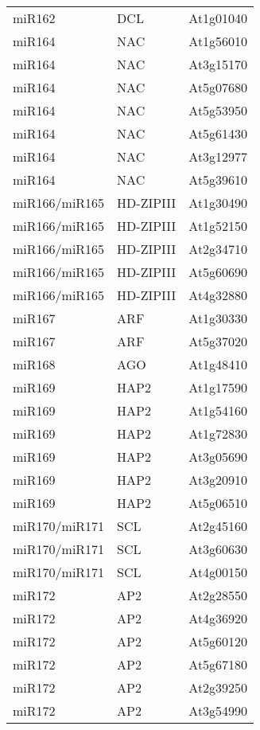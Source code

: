 \begin{table}
\begin{tabular}{lll}
miR162        & DCL          & At1g01040 \\
miR164        & NAC          & At1g56010 \\
miR164        & NAC          & At3g15170 \\
miR164        & NAC          & At5g07680 \\
miR164        & NAC          & At5g53950 \\
miR164        & NAC          & At5g61430 \\
miR164        & NAC          & At3g12977 \\
miR164        & NAC          & At5g39610 \\
miR166/miR165 & HD-ZIPIII    & At1g30490 \\
miR166/miR165 & HD-ZIPIII    & At1g52150 \\
miR166/miR165 & HD-ZIPIII    & At2g34710 \\
miR166/miR165 & HD-ZIPIII    & At5g60690 \\
miR166/miR165 & HD-ZIPIII    & At4g32880 \\
miR167        & ARF          & At1g30330 \\
miR167        & ARF          & At5g37020 \\
miR168        & AGO          & At1g48410 \\
miR169        & HAP2         & At1g17590 \\
miR169        & HAP2         & At1g54160 \\
miR169        & HAP2         & At1g72830 \\
miR169        & HAP2         & At3g05690 \\
miR169        & HAP2         & At3g20910 \\
miR169        & HAP2         & At5g06510 \\
miR170/miR171 & SCL          & At2g45160 \\
miR170/miR171 & SCL          & At3g60630 \\
miR170/miR171 & SCL          & At4g00150 \\
miR172        & AP2          & At2g28550 \\
miR172        & AP2          & At4g36920 \\
miR172        & AP2          & At5g60120 \\
miR172        & AP2          & At5g67180 \\
miR172        & AP2          & At2g39250 \\
miR172        & AP2          & At3g54990 \\

\end{tabular}
\end{table}
